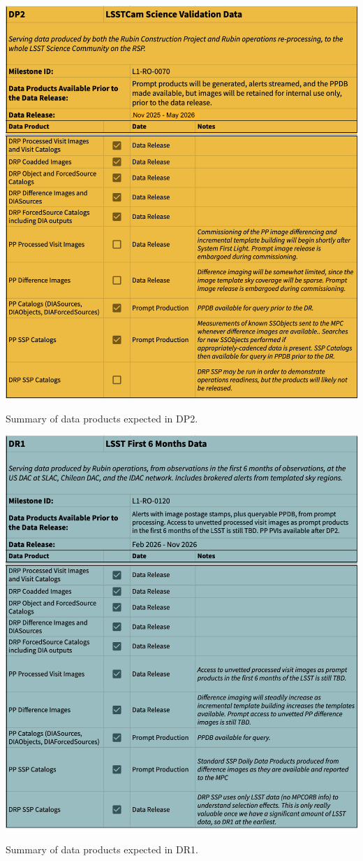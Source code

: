 \begin{table}[ht]
\centering
\includegraphics[width=0.9\linewidth]{figures/DP2-products}
\caption{Summary of data products expected in DP2.}
\label{tab:dp-two-products}
\end{table}

\begin{table}[ht]
\centering
\includegraphics[width=0.9\linewidth]{figures/DR1-products}
\caption{Summary of data products expected in DR1.}
\label{tab:dr-one-products}
\end{table}

\clearpage
